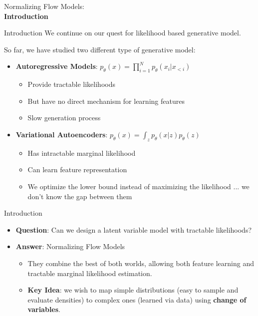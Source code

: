 \begin{frame}[allowframebreaks]{}
    \LARGE Normalizing Flow Models: \\[1.5ex] \textbf{Introduction}
\end{frame}

\begin{frame}[allowframebreaks]{Introduction}
We continue on our quest for likelihood based generative model.

So far, we have studied two different type of generative model:
\begin{itemize}
    \item \textbf{Autoregressive Models}: $p_\theta(x) = \prod^N_{i=1} p_\theta(x_i|x_{<i})$
    \begin{itemize}
        \item Provide tractable likelihoods
        \item But have no direct mechanism for learning features
        \item Slow generation process
    \end{itemize}
    \item \textbf{Variational Autoencoders}: $p_\theta(x) = \int_z p_\theta(x|z) p_\theta(z)$
    \begin{itemize}
        \item Has intractable marginal likelihood
        \item Can learn feature representation
        \item We optimize the lower bound instead of maximizing the likelihood ... we don't know the gap between them
    \end{itemize}
\end{itemize}
\end{frame}

\begin{frame}{Introduction}
\begin{itemize}
    \item \textbf{Question}: Can we design a latent variable model with tractable likelihoods?

    \item<2->\textbf{Answer}: Normalizing Flow Models
        \begin{itemize} 
            \item They combine the best of both worlds, allowing both feature learning and tractable marginal likelihood estimation.
            \item \textbf{Key Idea}: we wish to map simple distributions (easy to sample and evaluate densities) to complex ones (learned via data) using \textbf{change of variables}.
        \end{itemize}
\end{itemize}
\end{frame}

